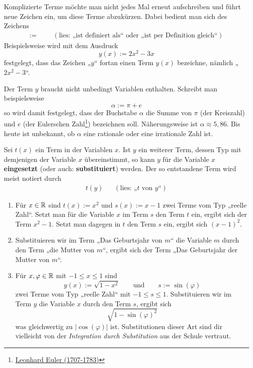 \begin{nota}[$:=$]
    Komplizierte Terme möchte man nicht jedes Mal erneut aufschreiben und führt neue Zeichen ein, um diese Terme abzukürzen. Dabei bedient man sich des Zeichens
    \begin{align*}
        := &&& (\text{lies: „ist definiert als“ oder „ist per Definition gleich“})
    \end{align*}
    Beispielsweise wird mit dem Ausdruck
        \[ y(x) := 2x^2-3x \]
    festgelegt, dass das Zeichen „$y$“ fortan einen Term $y(x)$ bezeichne, nämlich „$2x^2-3$“.

    Der Term $y$ braucht nicht unbedingt Variablen enthalten. Schreibt man beispielsweise
        \[ \alpha:= \pi + e\]
    so wird damit festgelegt, dass der Buchstabe $\alpha$ die Summe von $\pi$ (der Kreiszahl) und $e$ (der Eulerschen Zahl\footnote{\href{https://de.wikipedia.org/wiki/Leonhard_Euler}{Leonhard Euler (1707-1783)}}) bezeichnen soll. Näherungsweise ist $\alpha \approx 5{,}86$. Bis heute ist unbekannt, ob $\alpha$ eine rationale oder eine irrationale Zahl ist.
\end{nota}


\begin{defin}[* Variablensubstitution] \label{def:substitution}
    Sei $t(x)$ ein Term in der Variablen $x$. Ist $y$ ein weiterer Term, dessen Typ mit demjenigen der Variable $x$ übereinstimmt, so kann $y$ für die Variable $x$ \textbf{eingesetzt} (oder auch: \textbf{substituiert}) werden. Der so entstandene Term wird meist notiert durch
    \begin{align*}
        t(y) && (\text{lies: „$t$ von $y$“})
    \end{align*}
\end{defin}


\begin{bsp}[*] \quad \label{bsp:substitution}
    \begin{enumerate}
        \item Für $x\in\mathbb R$ sind $t(x):=x^2$ und $s(x):=x-1$ zwei Terme vom Typ „reelle Zahl“. Setzt man für die Variable $x$ im Term $s$ den Term $t$ ein, ergibt sich der Term $x^2-1$. Setzt man dagegen in $t$ den Term $s$ ein, ergibt sich $(x-1)^2$.
        \item Substituieren wir im Term „Das Geburtsjahr von $m$“ die Variable $m$ durch den Term „die Mutter von $m$“, ergibt sich der Term „Das Geburtsjahr der Mutter von $m$“.
        \item Für $x,\varphi\in \mathbb R$ mit $-1\le x\le 1$ sind
            \[ y(x):=\sqrt{1-x^2} \qquad\text{und}\qquad s:=\sin(\varphi) \]
        zwei Terme vom Typ „reelle Zahl“ mit $-1\le s\le 1$. Substituieren wir im Term $y$ die Variable $x$ durch den Term $s$, ergibt sich
            \[ \sqrt{1-\sin(\varphi)^2} \]
        was gleichwertig zu $\vert \cos(\varphi)\vert$ ist. Substitutionen dieser Art sind dir vielleicht von der \emph{Integration durch Substitution} aus der Schule vertraut.
    \end{enumerate}
\end{bsp}


